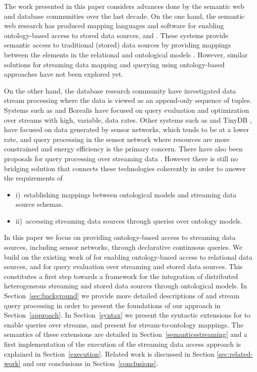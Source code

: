 The work presented in this paper considers advances done by the semantic web and database communities over the last decade. On the one hand, the semantic web research has produced mapping languages and software for enabling ontology-based access to stored data sources, \eg \rtwoo \cite{Barrasa_04} and \dtworq \cite{Bizer_07}.
These systems provide semantic access to traditional (stored) data sources by providing mappings between the elements in the relational and ontological models \cite{Sahoo_09}.
However, similar solutions for streaming data mapping and querying using ontology-based approaches have not been explored yet.

On the other hand, the database research community have investigated data stream processing where the data is viewed as an append-only sequence of tuples.
Systems such as \stream \cite{Arasu_06a} and Borealis \cite{Abadi_2005} have focused on query evaluation and optimization over streams with high, variable, data rates.
Other systems such as \snee \cite{Galpin_09} and TinyDB \cite{Madden_05}, have focused on data generated by sensor networks, which tends to be at a lower rate, and query processing in the sensor network where resources are more constrained and energy efficiency is the primary concern.
There have also been proposals for query processing over streaming \rdf data \cite{Bolles_08,Barbieri2010An-Execution-En}.
However there is still no bridging solution that connects these technologies coherently in order to answer the requirements of %
\begin{itemize}
\item i)~establishing mappings between ontological models and streaming data source schemas. 
\item ii)~accessing streaming data sources through queries over ontology models.
\end{itemize}
%


In this paper we focus on providing ontology-based access to streaming data sources, including sensor networks, through declarative continuous queries.
We build on the existing work of \rtwoo for enabling ontology-based access to relational data sources, and \snee for query evaluation over streaming and stored data sources.
This constitutes a first step towards a framework for the integration of distributed heterogeneous streaming and stored data sources through ontological models. %
In Section~\ref{sec:background} we provide more detailed descriptions of \rtwoo and stream query processing in order to present the foundations of our approach in Section~\ref{approach}. 
In Section~\ref{syntax} we present the syntactic extensions for \sparql to enable queries over \rdf streams, and present \stwoo for stream-to-ontology mappings. 
The semantics of these extensions are detailed in Section~\ref{semanticsstreaming} and a first implementation of the execution of the streaming data access approach is explained in Section~\ref{execution}.
Related work is discussed in Section \ref{sec:related-work} and our conclusions in Section~\ref{conclusions}. 



